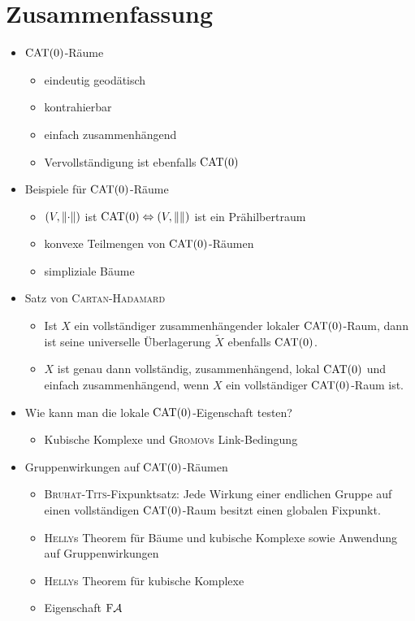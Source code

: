 \section*{Zusammenfassung}
\begin{itemize}
	\item $\operatorname{CAT(0)}$-Räume
		\begin{itemize}
			\item eindeutig geodätisch
			\item kontrahierbar
			\item einfach zusammenhängend
			\item Vervollständigung ist ebenfalls $\operatorname{CAT(0)}$
		\end{itemize}
	\item Beispiele für $\operatorname{CAT(0)}$-Räume
		\begin{itemize}
			\item $(V,\lVert\cdot\rVert)$ ist $\operatorname{CAT(0)} \Leftrightarrow (V,\lVert\rVert)$ ist ein Prähilbertraum
			\item konvexe Teilmengen von $\operatorname{CAT(0)}$-Räumen
			\item simpliziale Bäume
		\end{itemize}
	\item Satz von \textsc{Cartan-Hadamard}
		\begin{itemize}
			\item Ist $X$ ein vollständiger zusammenhängender lokaler $\operatorname{CAT(0)}$-Raum, dann ist seine universelle Überlagerung $\tilde{X}$ ebenfalls $\operatorname{CAT(0)}$.
			\item $X$ ist genau dann vollständig, zusammenhängend, lokal $\operatorname{CAT(0)}$ und einfach zusammenhängend, wenn $X$ ein vollständiger $\operatorname{CAT(0)}$-Raum ist.
		\end{itemize}
	\item Wie kann man die lokale $\operatorname{CAT(0)}$-Eigenschaft testen?
		\begin{itemize}
			\item Kubische Komplexe und \textsc{Gromov}s Link-Bedingung
		\end{itemize}
	\item Gruppenwirkungen auf $\operatorname{CAT(0)}$-Räumen
		\begin{itemize}
			\item \textsc{Bruhat-Tits}-Fixpunktsatz:
			Jede Wirkung einer endlichen Gruppe auf einen vollständigen $\operatorname{CAT(0)}$-Raum besitzt einen globalen Fixpunkt.
			\item \textsc{Helly}s Theorem für Bäume und kubische Komplexe sowie Anwendung auf Gruppenwirkungen
			\item \textsc{Helly}s Theorem für kubische Komplexe
			\item Eigenschaft $\text{F}\mathcal{A}$
		\end{itemize}
\end{itemize}